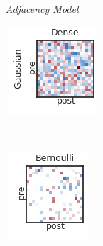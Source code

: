 \begin{figure}[t!]
  \centering
  \textit{~~~~~Adjacency Model} \\
  \hspace{1em}
  \begin{subfigure}[b]{1.25in}
    \centering
    \includegraphics[width=\textwidth]{figures/ch3/Dense-Gaussian.png}
  \end{subfigure}
  ~
  \hspace{-.1in}
  \begin{subfigure}[b]{1.10in}
    \centering
    \includegraphics[width=\textwidth]{figures/ch3/Bernoulli-Gaussian.png}

\end{subfigure}
\end{figure}
